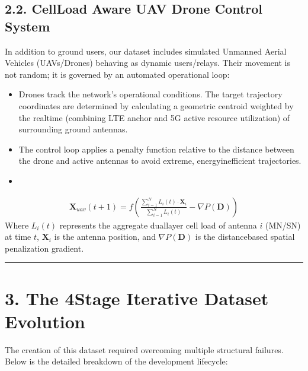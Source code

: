\documentclass[letterpaper,10pt,english]{sphinxmanual}
\begin{document}
\subsection{2.2. Cell\sphinxhyphen{}Load Aware UAV Drone Control System}
\label{\detokenize{dataset:cell-load-aware-uav-drone-control-system}}
\sphinxAtStartPar
In addition to ground users, our dataset includes simulated Unmanned Aerial Vehicles (UAVs/Drones) behaving as dynamic users/relays. Their movement is not random; it is governed by an automated operational loop:
\begin{itemize}
\item {} 
\sphinxAtStartPar
{} Drones track the network’s operational conditions. The target trajectory coordinates are determined by calculating a geometric centroid weighted by the real\sphinxhyphen{}time  (combining LTE anchor and 5G active resource utilization) of surrounding ground antennas.

\item {} 
\sphinxAtStartPar
{} The control loop applies a penalty function relative to the distance between the drone and active antennas to avoid extreme, energy\sphinxhyphen{}inefficient trajectories.

\item {} 
\sphinxAtStartPar
{}

\end{itemize}
\begin{equation*}
\begin{split}\mathbf{X}_{uav}(t+1) = f\left( \frac{\sum_{i=1}^{N} L_i(t) \cdot \mathbf{X}_i}{\sum_{i=1}^{N} L_i(t)} - \nabla P(\mathbf{D}) \right)\end{split}
\end{equation*}
\sphinxAtStartPar
Where \(L_i(t)\) represents the aggregate dual\sphinxhyphen{}layer cell load of antenna \(i\) (MN/SN) at time \(t\), \(\mathbf{X}_i\) is the antenna position, and \(\nabla P(\mathbf{D})\) is the distance\sphinxhyphen{}based spatial penalization gradient.

\sphinxAtStartPar
{}


\bigskip\hrule\bigskip



\section{3. The 4\sphinxhyphen{}Stage Iterative Dataset Evolution}
\label{\detokenize{dataset:the-4-stage-iterative-dataset-evolution}}
\sphinxAtStartPar
The creation of this dataset required overcoming multiple structural failures. Below is the detailed breakdown of the development lifecycle:
\end{document}
